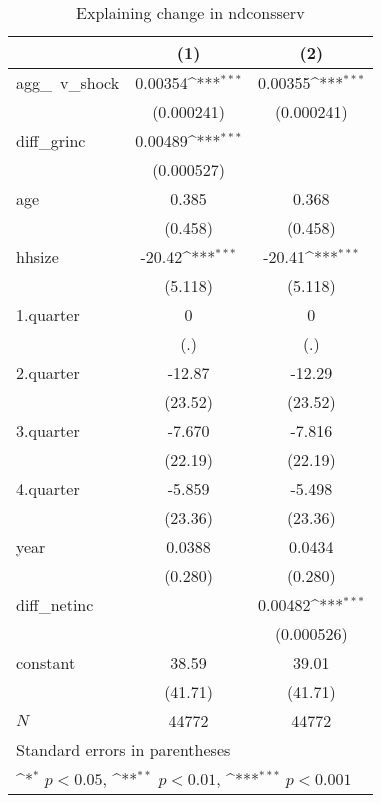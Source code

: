 \begin{table}[htbp]\centering
\def\sym#1{\ifmmode^{#1}\else\(^{#1}\)\fi}
\caption{\label{ndconsserv\_deltacons} Explaining change in ndconsserv}
\begin{tabular}{l*{2}{c}}
\hline\hline
            &\multicolumn{1}{c}{(1)}         &\multicolumn{1}{c}{(2)}         \\
\hline
agg\_~v\_shock&     0.00354\sym{***}&     0.00355\sym{***}\\
            &  (0.000241)         &  (0.000241)         \\
diff\_grinc  &     0.00489\sym{***}&                     \\
            &  (0.000527)         &                     \\
age         &       0.385         &       0.368         \\
            &     (0.458)         &     (0.458)         \\
hhsize      &      -20.42\sym{***}&      -20.41\sym{***}\\
            &     (5.118)         &     (5.118)         \\
1.quarter   &           0         &           0         \\
            &         (.)         &         (.)         \\
2.quarter   &      -12.87         &      -12.29         \\
            &     (23.52)         &     (23.52)         \\
3.quarter   &      -7.670         &      -7.816         \\
            &     (22.19)         &     (22.19)         \\
4.quarter   &      -5.859         &      -5.498         \\
            &     (23.36)         &     (23.36)         \\
year        &      0.0388         &      0.0434         \\
            &     (0.280)         &     (0.280)         \\
diff\_netinc &                     &     0.00482\sym{***}\\
            &                     &  (0.000526)         \\
constant    &       38.59         &       39.01         \\
            &     (41.71)         &     (41.71)         \\
\hline
\(N\)       &       44772         &       44772         \\
\hline\hline
\multicolumn{3}{l}{\footnotesize Standard errors in parentheses}\\
\multicolumn{3}{l}{\footnotesize \sym{*} \(p<0.05\), \sym{**} \(p<0.01\), \sym{***} \(p<0.001\)}\\
\end{tabular}
\end{table}
